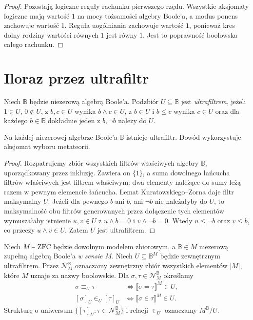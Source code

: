 \begin{proof}
Pozostają logiczne reguły
rachunku pierwszego rzędu.
Wszystkie aksjomaty logiczne
mają wartość $1$ na mocy
tożsamości algebry Boole'a,
a modus ponens zachowuje
wartość $1$. Reguła uogólniania
zachowuje wartość $1$, ponieważ
kres dolny rodziny wartości
równych $1$ jest równy $1$.
Jest to poprawność boolowska
całego rachunku.
\end{proof}

\section{Iloraz przez ultrafiltr}

\begin{definicja}
\label{def:boolean35-ultrafilter}
Niech $\mathbb B$ będzie niezerową
algebrą Boole'a. Podzbiór
$U\subseteq\mathbb B$ jest
\emph{ultrafiltrem}, jeżeli
$1\in U$, $0\notin U$,
z $b,c\in U$ wynika $b\wedge c\in U$,
z $b\in U$ i $b\le c$ wynika $c\in U$
oraz dla każdego $b\in\mathbb B$
dokładnie jeden z $b,\neg b$
należy do $U$.
\end{definicja}

\begin{lemat}
\label{lem:boolean35-ultrafilter-exists}
Na każdej niezerowej algebrze
Boole'a $\mathbb B$ istnieje ultrafiltr.
Dowód wykorzystuje aksjomat
wyboru metateorii.
\end{lemat}
\begin{proof}
Rozpatrujemy zbiór wszystkich
filtrów właściwych algebry
$\mathbb B$, uporządkowany
przez inkluzję. Zawiera on
$\{1\}$, a suma dowolnego
łańcucha filtrów właściwych
jest filtrem właściwym:
dwa elementy należące do
sumy leżą razem w pewnym
elemencie łańcucha.
Lemat Kuratowskiego--Zorna
daje filtr maksymalny $U$.
Jeżeli dla pewnego $b$
ani $b$, ani $\neg b$
nie należałyby do $U$,
to maksymalność obu filtrów
generowanych przez dołączenie
tych elementów wymuszałaby
istnienie $u,v\in U$ z
$u\wedge b=0$ i
$v\wedge\neg b=0$.
Wtedy $u\le\neg b$ oraz $v\le b$,
co przeczy $u\wedge v\in U$.
Zatem $U$ jest ultrafiltrem.
\end{proof}

\begin{definicja}
\label{def:boolean35-quotient}
Niech $M\models\mathrm{ZFC}$ będzie
dowolnym modelem zbiorowym,
a $\mathbb B\in M$ niezerową
zupełną algebrą Boole'a
\emph{w sensie $M$}.
Niech $U\subseteq\mathbb B^M$
będzie zewnętrznym ultrafiltrem.
Przez $\mathcal N_M^{\mathbb B}$
oznaczamy zewnętrzny zbiór
wszystkich elementów $|M|$,
które $M$ uznaje za nazwy
boolowskie. Dla
$\sigma,\tau\in\mathcal N_M^{\mathbb B}$
określamy
\[
\begin{aligned}
\sigma\equiv_U\tau
 &\iff \llbracket\sigma=\tau\rrbracket^M\in U,\\
[\sigma]_U\in_U[\tau]_U
 &\iff \llbracket\sigma\in\tau\rrbracket^M\in U.
\end{aligned}
\]
Strukturę o uniwersum
$\{[\tau]_U:\tau\in\mathcal N_M^{\mathbb B}\}$
i relacji $\in_U$ oznaczamy
$M^{\mathbb B}/U$.
\end{definicja}

